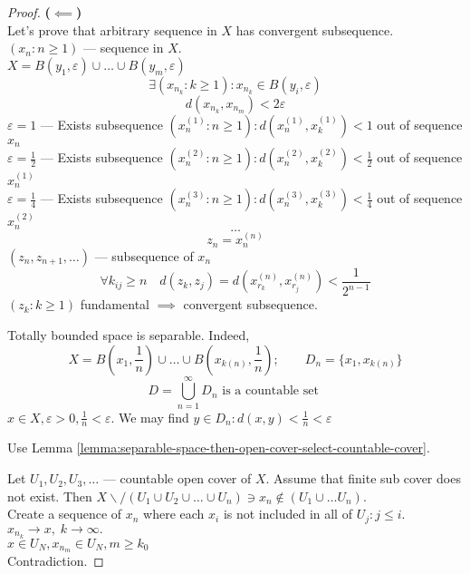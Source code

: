 \begin{proof}
  \textbf{($\impliedby$)}\\
  Let's prove that arbitrary sequence in $X$ has convergent subsequence.\\
  $(x_n: n \ge 1)$ --- sequence in $X$.\\
  $X = B(y_1, \varepsilon) \cup \ldots \cup B(y_m, \varepsilon)$ \\
  \[ \exists (x_{n_{k}}: k \ge 1) : x_{n_{k}} \in  B(y_i, \varepsilon) \] 
  $$d(x_{n_{k}}, x_{n_{m}}) < 2 \varepsilon$$
  $\varepsilon = 1$ --- Exists subsequence $(x_{n}^{(1)}: n \ge 1) : d(x_{n}^{(1)}, x_{k}^{(1)}) < 1$ out of sequence $x_n$ \\
  $\varepsilon = \frac{1}{2}$ --- Exists subsequence $(x_{n}^{(2)}: n \ge 1) : d(x_{n}^{(2)}, x_{k}^{(2)}) < \frac{1}{2}$ out of sequence $x_{n}^{(1)}$ \\
  $\varepsilon = \frac{1}{4}$ --- Exists subsequence $(x_{n}^{(3)}: n \ge 1) : d(x_{n}^{(3)}, x_{k}^{(3)}) < \frac{1}{4}$ out of sequence $x_{n}^{(2)}$ \\
  \[ \ldots \] 
  \[ z_n = x_{n}^{(n)} \] 
  $(z_n, z_{n+1}, \ldots)$ --- subsequence of $x_n$ \\
  \[ \forall k_{ij} \ge n \quad d(z_k, z_j) = d(x_{r_k}^{(n)}, x_{r_j}^{(n)}) < \frac{1}{2^{n-1}} \]
  $\left( z_k  : k \ge 1\right)$ fundamental $\implies$ convergent subsequence.

  Totally bounded space is separable. Indeed,
  \[ X = B(x_1, \frac{1}{n}) \cup \ldots\cup B(x_{k(n)}, \frac{1}{n}); \qquad
  D_n = \{x_1, x_{k(n)} \} \] 
  $$D = \bigcup_{n=1}^{\infty} D_n \text{ is a countable set }$$
  $x \in  X, \varepsilon > 0, \frac{1}{n} < \varepsilon. $
  We may find $y \in  D_n : d(x,y) < \frac{1}{n} < \varepsilon$ 

  Use Lemma \ref{lemma:separable-space-then-open-cover-select-countable-cover}.

  Let $U_1, U_2, U_3, \ldots$ --- countable open cover of $X$. Assume that finite sub cover does not exist.
  Then $X \backslash / \left(  U_1 \cup U_2 \cup \ldots \cup U_n \right) \ni x_n \not\in \left( U_1 \cup \ldots U_n \right) $.\\
  Create a sequence of $x_n$ where each $x_i$ is not included in all of $U_j: j \le  i$.\\
  $x_{n_{k}} \to  x, \; k \to  \infty.$ \\
  $x \in  U_{N}, x_{n_{m}} \in U_{N}, m \ge k_0$ \\
  Contradiction.


\end{proof}


